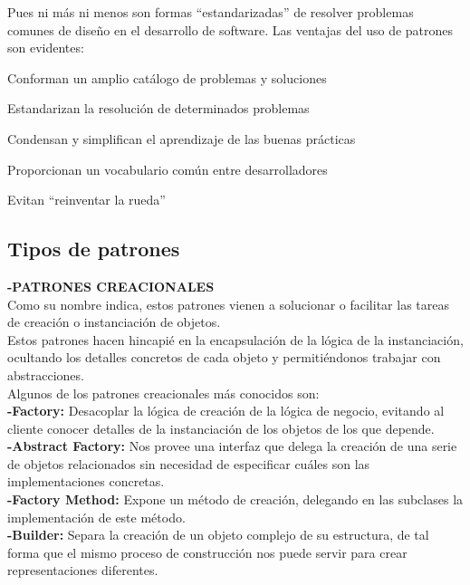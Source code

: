 \documentclass[twoside,twocolumn]{article}
\begin{document}
Pues ni más ni menos son formas “estandarizadas” de resolver problemas comunes de diseño en el desarrollo de software.
Las ventajas del uso de patrones son evidentes:
\item Conforman un amplio catálogo de problemas y soluciones
\item Estandarizan la resolución de determinados problemas
\item Condensan y simplifican el aprendizaje de las buenas prácticas
\item Proporcionan un vocabulario común entre desarrolladores
\item Evitan “reinventar la rueda”




\subsection{Tipos de patrones}
\textbf{-PATRONES CREACIONALES}\\
Como su nombre indica, estos patrones vienen a solucionar o facilitar las tareas de creación o instanciación de objetos.\\
Estos patrones hacen hincapié en la encapsulación de la lógica de la instanciación, ocultando los detalles concretos de cada objeto y permitiéndonos trabajar con abstracciones.\\
Algunos de los patrones creacionales más conocidos son:\\
\textbf{-Factory:} Desacoplar la lógica de creación de la lógica de negocio, evitando al cliente conocer detalles de la instanciación de los objetos de los que depende.\\
\textbf{-Abstract Factory:} Nos provee una interfaz que delega la creación de una serie de objetos relacionados sin necesidad de especificar cuáles son las implementaciones concretas.\\
\textbf{-Factory Method:} Expone un método de creación, delegando en las subclases la implementación de este método.\\
\textbf{-Builder:} Separa la creación de un objeto complejo de su estructura, de tal forma que el mismo proceso de construcción nos puede servir para crear representaciones diferentes.\\
\end{document}
